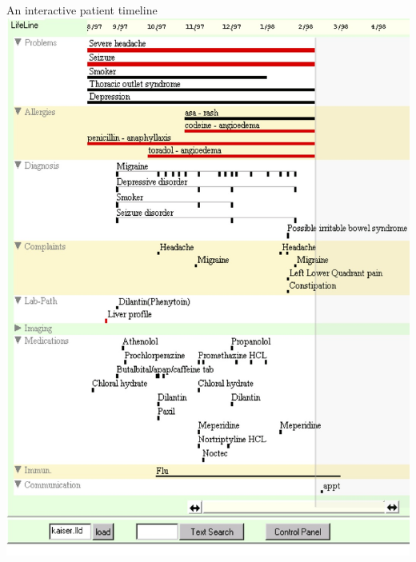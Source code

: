 \documentclass[12pt,compress]{beamer}
\begin{document}
\begin{frame}{An interactive patient timeline}
\includegraphics[width=\textwidth,trim={0 5in 0 0},clip]{kaiserlifelines.jpg}
\end{frame}
\end{document}
